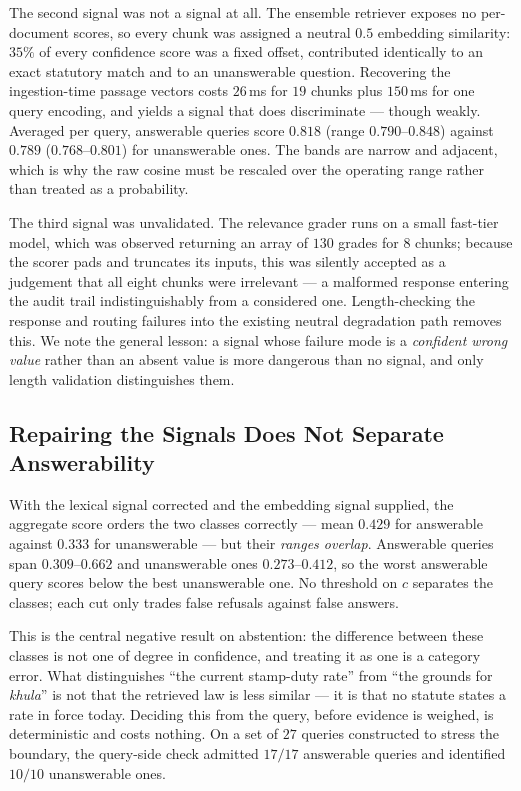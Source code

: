 \documentclass[conference]{IEEEtran}
\begin{document}
The second signal was not a signal at all. The ensemble retriever exposes no
per-document scores, so every chunk was assigned a neutral $0.5$ embedding
similarity: $35\%$ of every confidence score was a fixed offset, contributed
identically to an exact statutory match and to an unanswerable question.
Recovering the ingestion-time passage vectors costs $26$\,ms for $19$ chunks
plus $150$\,ms for one query encoding, and yields a signal that does discriminate
--- though weakly. Averaged per query, answerable queries score $0.818$
(range $0.790$--$0.848$) against $0.789$ ($0.768$--$0.801$) for unanswerable
ones. The bands are narrow and adjacent, which is why the raw cosine must be
rescaled over the operating range rather than treated as a probability.

The third signal was unvalidated. The relevance grader runs on a small
fast-tier model, which was observed returning an array of $130$ grades for $8$
chunks; because the scorer pads and truncates its inputs, this was silently
accepted as a judgement that all eight chunks were irrelevant --- a malformed
response entering the audit trail indistinguishably from a considered one.
Length-checking the response and routing failures into the existing neutral
degradation path removes this. We note the general lesson: a signal whose
failure mode is a \emph{confident wrong value} rather than an absent value is
more dangerous than no signal, and only length validation distinguishes them.

\subsection{Repairing the Signals Does Not Separate Answerability}
\label{sec:answerability}
With the lexical signal corrected and the embedding signal supplied, the
aggregate score orders the two classes correctly --- mean $0.429$ for answerable
against $0.333$ for unanswerable --- but their \emph{ranges overlap}. Answerable
queries span $0.309$--$0.662$ and unanswerable ones $0.273$--$0.412$, so the
worst answerable query scores below the best unanswerable one. No threshold on
$c$ separates the classes; each cut only trades false refusals against false
answers.

This is the central negative result on abstention: the difference between these
classes is not one of degree in confidence, and treating it as one is a category
error. What distinguishes ``the current stamp-duty rate'' from ``the grounds for
\emph{khula}'' is not that the retrieved law is less similar --- it is that no
statute states a rate in force today. Deciding this from the query, before
evidence is weighed, is deterministic and costs nothing. On a set of $27$
queries constructed to stress the boundary, the query-side check admitted
$17/17$ answerable queries and identified $10/10$ unanswerable ones.
\end{document}
